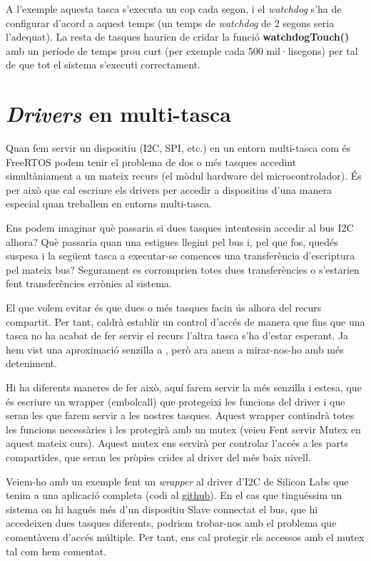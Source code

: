 A l'exemple aquesta tasca s'executa un cop cada segon, i el {\em watchdog} s'ha de configurar d'acord a aquest temps (un temps de {\em watchdog} de 2 segons seria l'adequat). La resta de tasques haurien de cridar la funció {\bf watchdogTouch()} amb un període de temps prou curt (per exemple cada 500 mil·lisegons) per tal de que tot el sistema s'executi correctament.

\chapter{{\em Drivers} en multi-tasca}
Quan fem servir un dispositiu (I2C, SPI, etc.) en un entorn multi-tasca com és 
FreeRTOS podem tenir el problema de dos o més tasques accedint simultàniament a 
un mateix recurs (el mòdul hardware del microcontrolador). És per això que cal 
escriure els drivers per accedir a dispositius d'una manera especial quan 
treballem en entorns multi-tasca.

Ens podem imaginar què passaria si dues tasques intentessin accedir al bus I2C 
alhora? Què passaria quan una estigues llegint pel bus i, pel que fos, quedés 
suspesa i la següent tasca a executar-se comences una transferència d'escriptura 
pel mateix bus? Segurament es corromprien totes dues transferències o s'estarien 
fent transferències errònies al sistema.

El que volem evitar és que dues o més tasques facin ús alhora del recurs 
compartit. Per tant, caldrà establir un control d'accés de manera que fins que 
una tasca no ha acabat de fer servir el recurs l'altra tasca s'ha d'estar 
esperant. Ja hem vist una aproximació  senzilla a , 
però ara anem a mirar-nos-ho amb més deteniment.

Hi ha diferents maneres de fer això, aquí farem servir la més senzilla 
i estesa, que és escriure un wrapper (embolcall) que protegeixi les funcions del 
driver i que seran les que farem servir a les nostres tasques. Aquest wrapper 
contindrà totes les funcions necessàries i les protegirà amb un mutex (veieu 
Fent servir Mutex en aquest mateix curs). Aquest mutex ens servirà per controlar 
l'accés a les parts compartides, que seran les pròpies crides al driver del més 
baix nivell.

Veiem-ho amb un exemple fent un {\em wrapper} al driver d'I2C de Silicon Labs que 
tenim a una aplicació completa (codi al \href{https://github.com/mariusmm/cursembedded/tree/master/Simplicity/FreeRTOS_App_1}{github}). En el cas que tinguéssim 
un sistema on hi hagués més d'un dispositiu Slave connectat el bus, que hi 
accedeixen dues tasques diferents, podriem trobar-nos amb el problema que 
comentàvem d'accés múltiple. Per tant, ens cal protegir els accessos amb el 
mutex tal com hem comentat.

